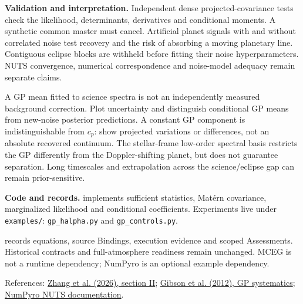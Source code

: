 \documentclass[10pt,a4paper]{article}
\begin{document}
\textbf{Validation and interpretation.}
Independent dense projected-covariance tests check the likelihood,
determinants, derivatives and conditional moments. A synthetic common master
must cancel. Artificial planet signals with and without correlated noise
test recovery and the risk of absorbing a moving planetary line. Contiguous
eclipse blocks are withheld before fitting their noise hyperparameters.
NUTS convergence, numerical correspondence and noise-model adequacy remain
separate claims.

A GP mean fitted to science spectra is not an independently measured
background correction. Plot uncertainty and distinguish conditional GP means
from new-noise posterior predictions. A constant GP component is
indistinguishable from $c_p$: show projected variations or differences,
not an absolute recovered continuum. The stellar-frame low-order spectral
basis restricts the GP differently from the Doppler-shifting planet, but
does not guarantee separation. Long timescales and extrapolation across the
science/eclipse gap can remain prior-sensitive.

\textbf{Code and records.}
 implements sufficient statistics, Mat\'ern
covariance, marginalized likelihood and conditional coefficients.
Experiments live under \texttt{examples/}: \texttt{gp\_halpha.py} and
\texttt{gp\_controls.py}.


 records equations, source Bindings,
execution evidence and scoped Assessments. Historical contracts and
full-atmosphere readiness remain unchanged. MCEG is not a runtime dependency;
NumPyro is an optional example dependency.

\small References:
\href{https://arxiv.org/html/2606.23899v1#S2}{Zhang et al. (2026), section II};
\href{https://arxiv.org/abs/1109.3251}{Gibson et al. (2012), GP systematics};
\href{https://num.pyro.ai/en/stable/mcmc.html}{NumPyro NUTS documentation}.
\end{document}

